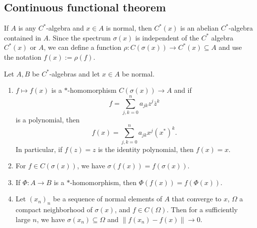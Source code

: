 \subsection{Continuous functional theorem}

If $A$ is any $C^*$-algebra and $x \in A$ is normal, then $C^*(x)$
is an abelian $C^*$-algebra contained in $A$. Since the spectrum $\sigma(x)$
is independent of the $C^*$ algebra $C^*(x)$ or $A$, we can define a function
$\rho: C(\sigma(x)) \to C^*(x) \subseteq A$ and use the notation $f(x) := \rho(f)$.

\begin{theorem}
  Let $A, B$ be $C^*$-algebras and let $x \in A$ be normal.
  \begin{enumerate}
    \item $f \mapsto f(x)$ is a $*$-homomorphism $C(\sigma(x)) \to A$ and if 
    $$f = \sum_{j, k = 0} ^n a_{jk} z^j \overline{z}^k$$ is a polynomial, then 
    $$f(x) = \sum_{j, k = 0} ^n a_{jk} x^j (x^*)^k.$$
    In particular, if $f(z) = z$ is the identity polynomial, then $f(x) = x$.
    \item For $f \in C(\sigma(x))$, we have $\sigma(f(x)) = f(\sigma(x))$.
    \item If $\Phi: A \to B$ is a $*$-homomorphism, then $\Phi(f(x)) = f(\Phi(x))$.
    \item Let $(x_n)_n$ be a sequence of normal elements of $A$ that converge to $x$,
    $\Omega$ a compact neighborhood of $\sigma(x)$, and $f \in C(\Omega)$. Then for a 
    sufficiently large $n$, we have $\sigma(x_n) \subseteq \Omega$ and $\|f(x_n) - f(x)\| \to 0$.
  \end{enumerate}
\end{theorem}

